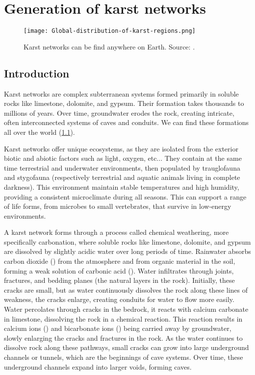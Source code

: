 \graphicspath{{"./Chapter 2/Karsts/"}}

\chapter{Generation of karst networks}
\label{chap:karsts}
\minitoc

\begin{figure}
    \texttt{[image: Global-distribution-of-karst-regions.png]}
    \caption{Karst networks can be find anywhere on Earth. Source: \citep{Huang2022}.}
    \label{fig:karsts_distribution}
\end{figure}

\section{Introduction}
\label{sec:karst_introduction}
Karst networks are complex subterranean systems formed primarily in soluble rocks like limestone, dolomite, and gypsum. Their formation takes thousands to millions of years. Over time, groundwater erodes the rock, creating intricate, often interconnected systems of caves and conduits. We can find these formations all over the world (\cref{fig:karsts_distribution}).

Karst networks offer unique ecosystems, as they are isolated from the exterior biotic and abiotic factors such as light, oxygen, etc... They contain at the same time terrestrial and underwater environments, then populated by trauglofauna and stygofauna (respectively terrestrial and aquatic animals living in complete darkness). This environment maintain stable temperatures and high humidity, providing a consistent microclimate during all seasons. This can support a range of life forms, from microbes to small vertebrates, that survive in low-energy environments.

A karst network forms through a process called chemical weathering, more specifically carbonation, where soluble rocks like limestone, dolomite, and gypsum are dissolved by slightly acidic water over long periods of time.  Rainwater absorbs carbon dioxide () from the atmosphere and from organic material in the soil, forming a weak solution of carbonic acid (). Water infiltrates through joints, fractures, and bedding planes (the natural layers in the rock). Initially, these cracks are small, but as water continuously dissolves the rock along these lines of weakness, the cracks enlarge, creating conduits for water to flow more easily. Water percolates through cracks in the bedrock, it reacts with calcium carbonate in limestone, dissolving the rock in a chemical reaction. This reaction results in calcium ions () and bicarbonate ions () being carried away by groundwater, slowly enlarging the cracks and fractures in the rock. As the water continues to dissolve rock along these pathways, small cracks can grow into large underground channels or tunnels, which are the beginnings of cave systems. Over time, these underground channels expand into larger voids, forming caves.

